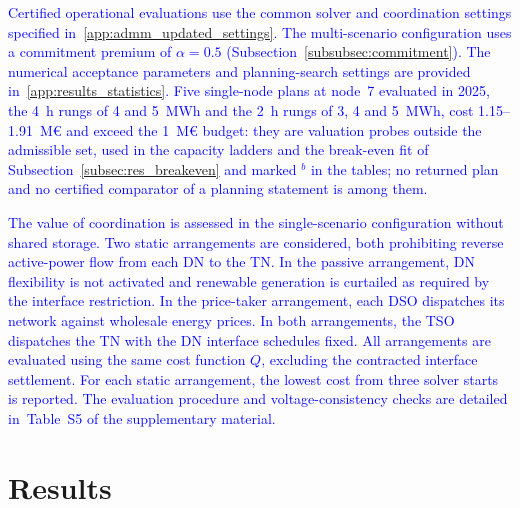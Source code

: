 \documentclass[preprint,12pt]{elsarticle}
\begin{document}
\textcolor{blue}{
    Certified operational evaluations use the common solver and coordination settings specified in~\ref{app:admm_updated_settings}.
    The multi-scenario configuration uses a commitment premium of $\alpha = 0.5$ (Subsection~\ref{subsubsec:commitment}).
    The numerical acceptance parameters and planning-search settings are provided in~\ref{app:results_statistics}.
    Five single-node plans at node~7 evaluated in 2025, the 4~h rungs of 4 and 5~MWh and the 2~h rungs of 3, 4 and 5~MWh, cost 1.15--1.91~M\euro{} and exceed the 1~M\euro{} budget: they are valuation probes outside the admissible set, used in the capacity ladders and the break-even fit of Subsection~\ref{subsec:res_breakeven} and marked $^{b}$ in the tables; no returned plan and no certified comparator of a planning statement is among them.
}

\textcolor{blue}{
    The value of coordination is assessed in the single-scenario configuration without shared storage. Two static arrangements are considered, both prohibiting reverse active-power flow from each DN to the TN. In the passive arrangement, DN flexibility is not activated and renewable generation is curtailed as required by the interface restriction. In the price-taker arrangement, each DSO dispatches its network against wholesale energy prices. In both arrangements, the TSO dispatches the TN with the DN interface schedules fixed.
    All arrangements are evaluated using the same cost function $Q$, excluding the contracted interface settlement. For each static arrangement, the lowest cost from three solver starts is reported. The evaluation procedure and voltage-consistency checks are detailed in~Table~S5 of the supplementary material.
}


\section{Results}
\label{sec:results}
\end{document}
